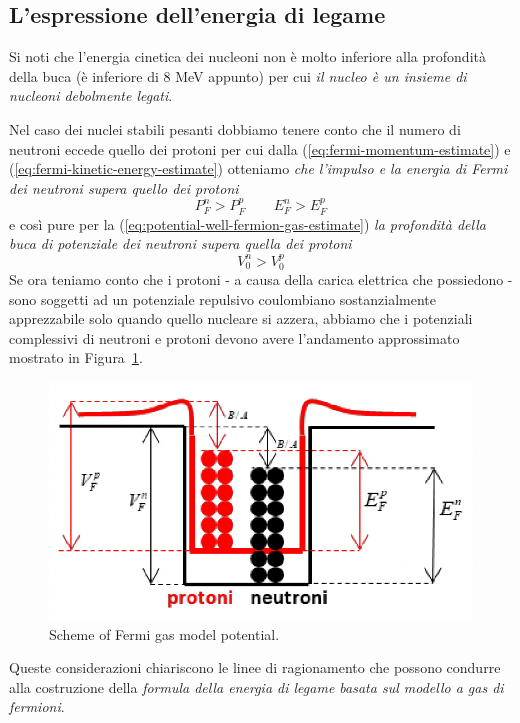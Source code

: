 \subsection{L'espressione dell'energia di legame}\label{subsec:energia-di-legame-fermions-gas}

Si noti che l’energia cinetica dei nucleoni non è molto inferiore alla profondità della buca (è inferiore di 8 MeV appunto) per cui \emph{il nucleo è un insieme di nucleoni debolmente legati}.

Nel caso dei nuclei stabili pesanti dobbiamo tenere conto che il numero di neutroni eccede quello dei protoni per cui dalla (\ref{eq:fermi-momentum-estimate}) e (\ref{eq:fermi-kinetic-energy-estimate}) otteniamo \emph{che l’impulso e la energia di Fermi dei neutroni supera quello dei protoni}
\[
P_{F}^n > P_{F}^p \qquad E_{F}^n > E_{F}^p
\]
e così pure per la (\ref{eq:potential-well-fermion-gas-estimate}) \emph{la profondità della buca di potenziale dei neutroni supera quella dei protoni}
\[
V_{0}^n > V_{0}^p
\]
Se ora teniamo conto che i protoni - a causa della carica elettrica che possiedono - sono soggetti ad un potenziale repulsivo coulombiano sostanzialmente apprezzabile solo
quando quello nucleare si azzera, abbiamo che i potenziali complessivi di
neutroni e protoni devono avere l’andamento approssimato mostrato in Figura~\ref{fig:fermi-gas-model-potential-scheme}.

\begin{figure}
	\centering
	\includegraphics{../figs/fermi-gas-model-potential-scheme}
	\caption{Scheme of Fermi gas model potential.}
	\label{fig:fermi-gas-model-potential-scheme}
\end{figure}

Queste considerazioni chiariscono le linee di ragionamento che possono condurre alla costruzione della \emph{formula della energia di legame basata sul modello a gas di fermioni}.

